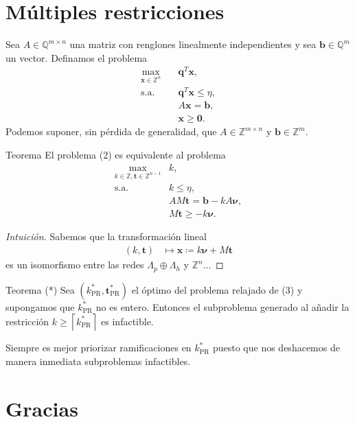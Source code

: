 \documentclass[aspectratio=169,professionalfonts]{beamer}
\newcommand{\Z}{\mathbb{Z}}
\newcommand{\Q}{\mathbb{Q}}
\renewcommand{\vec}[1]{\boldsymbol{#1}}
\newcommand{\optr}[1]{#1^*_{\text{PR}}}
\newcommand{\ceil}[1]{\left\lceil #1 \right\rceil}
\begin{document}
\section{Múltiples restricciones}
\begin{frame}
	Sea $A \in \Q^{m \times n}$ una matriz con renglones linealmente
	independientes y sea $\vec{b} \in \Q^m$ un vector. Definamos el problema
	\begin{subequations}
		\begin{align}
			\max_{\vec{x} \in \Z^n} \quad
				& \vec{q}^T\vec{x}, \\
			\text{s.a.} \quad
					& \vec{q}^T\vec{x} \leq \eta, \\
					& A\vec{x} = \vec{b}, \\
					& \vec{x} \geq \vec{0}. \nonumber
		\end{align}
	\end{subequations}
	Podemos suponer, sin pérdida de generalidad, que $A \in \Z^{m \times n}$ y
	$\vec{b} \in \Z^m$.
\end{frame}

\begin{frame}
	\begin{block}{Teorema}
		El problema (2) es equivalente al problema
		\begin{subequations}
			\begin{align}
				\max_{k \in \Z, \vec{t} \in \Z^{n-1}}
					& k, \\
				\text{s.a.} \quad
					& k \leq \eta, \\
					& AM\vec{t} = \vec{b} - kA\vec{\nu}, \\
					& M\vec{t} \geq -k\vec{\nu}.
			\end{align}
		\end{subequations}
	\end{block}
	\begin{proof}[Intuición]
		Sabemos que la transformación lineal
		\begin{align*}
			(k, \vec{t}) &\mapsto \vec{x} \coloneq k\vec{\nu} + M\vec{t}
		\end{align*}
		es un isomorfismo entre las redes $\Lambda_p \oplus \Lambda_h$ y $\Z^n$...
	\end{proof}
\end{frame}

\begin{frame}
	\begin{block}{Teorema (*)}
		Sea $(\optr{k}, \optr{\vec{t}})$ el óptimo del problema relajado de
		(3) y supongamos que $\optr{k}$ no es entero.
		Entonces el subproblema generado al añadir la restricción $k \geq
		\ceil{\optr{k}}$ es infactible.
	\end{block}
	Siempre es mejor priorizar ramificaciones en $\optr{k}$ puesto que nos
	deshacemos de manera inmediata subproblemas infactibles.
\end{frame}

\section{Gracias}
\end{document}

